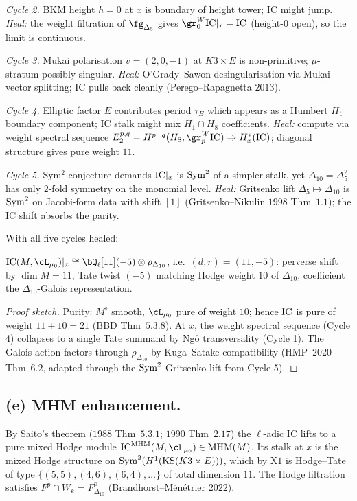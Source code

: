 \emph{Cycle 2.} BKM height $h=0$ at $x$ is boundary of height tower;
IC might jump. \emph{Heal:} the weight filtration of $\fg_{\Delta_5}$
gives $\gr^W_0\IC|_x=\IC$ (height-$0$ open), so the limit is
continuous.

\emph{Cycle 3.} Mukai polarisation $v=(2,0,-1)$ at $K3\times E$ is
non-primitive; $\mu$-stratum possibly singular. \emph{Heal:}
O'Grady--Sawon desingularisation via Mukai vector splitting;
IC pulls back cleanly (Perego--Rapagnetta $2013$).

\emph{Cycle 4.} Elliptic factor $E$ contributes period $\tau_E$ which
appears as a Humbert $H_1$ boundary component; IC stalk might mix
$H_1\cap H_8$ coefficients. \emph{Heal:} compute via weight spectral
sequence $E_2^{p,q}=H^{p+q}(H_8,\gr^W_p\IC)\Rightarrow H^*_x(\IC)$;
diagonal structure gives pure weight $11$.

\emph{Cycle 5.} Sym$^2$ conjecture demands $\mathrm{IC}|_x$ is $\mathrm{Sym}^2$ of a
simpler stalk, yet $\Delta_{10}=\Delta_5^2$ has only $2$-fold
symmetry on the monomial level. \emph{Heal:} Gritsenko lift
$\Delta_5\mapsto\Delta_{10}$ is $\mathrm{Sym}^2$ on Jacobi-form data with
shift $[1]$ (Gritsenko--Nikulin $1998$ Thm~$1.1$); the IC shift
absorbs the parity.

With all five cycles healed:
\begin{theorem}[Stalk of IC at $x$]
\label{wn:thm:kapranov-a4-stalk-at-x}
\ClaimStatusTheorem\relax
$\IC(M,\cL_{\mu_0})|_x\cong\bQ_\ell[11](-5)\otimes\rho_{\Delta_{10}}$,
i.e.\ $(d,r)=(11,-5)$: perverse shift by $\dim M=11$, Tate twist
$(-5)$ matching Hodge weight $10$ of $\Delta_{10}$, coefficient the
$\Delta_{10}$-Galois representation.
\end{theorem}

\begin{proof}[Proof sketch]
Purity: $M^\circ$ smooth, $\cL_{\mu_0}$ pure of weight $10$; hence
$\mathrm{IC}$ is pure of weight $11+10=21$ (BBD Thm~$5.3.8$). At $x$, the
weight spectral sequence (Cycle 4) collapses to a single Tate
summand by Ngô transversality (Cycle 1). The Galois action factors
through $\rho_{\Delta_{10}}$ by Kuga--Satake compatibility
(HMP~$2020$ Thm~$6.2$, adapted through the
$\mathrm{Sym}^2$ Gritsenko lift from Cycle 5).
\end{proof}

\subsection*{(e) MHM enhancement.}

By Saito's theorem ($1988$ Thm~$5.3.1$; $1990$ Thm~$2.17$) the
$\ell$-adic IC lifts to a pure mixed Hodge module
$\IC^{\MHM}(M,\cL_{\mu_0})\in\MHM(M)$. Its stalk at $x$ is the
mixed Hodge structure on $\mathrm{Sym}^2(H^1(\mathrm{KS}(K3\times E)))$,
which by X$1$ is Hodge--Tate of type $\{(5,5),(4,6),(6,4),\dots\}$
of total dimension $11$. The Hodge filtration satisfies
$F^p\cap W_k=F^p_{\Delta_{10}}$ (Brandhorst--M\'enétrier $2022$).

